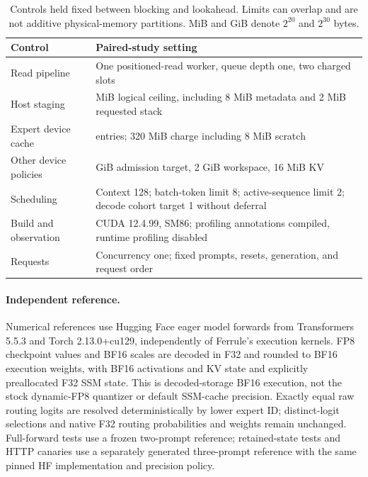 \begin{table}[!htbp]
\centering
\small
\begin{tabularx}{\linewidth}{@{}l>{\raggedright\arraybackslash}X@{}}
\toprule
Control & Paired-study setting \\
\midrule
Read pipeline & One positioned-read worker, queue depth one, two charged slots \\
Host staging & 64 MiB logical ceiling, including 8 MiB metadata and 2 MiB requested stack \\
Expert device cache & 64 entries; 320 MiB charge including 8 MiB scratch \\
Other device policies & 7 GiB admission target, 2 GiB workspace, 16 MiB KV \\
Scheduling & Context 128; batch-token limit 8; active-sequence limit 2; decode cohort target 1 without deferral \\
Build and observation & CUDA 12.4.99, SM86; profiling annotations compiled, runtime profiling disabled \\
Requests & Concurrency one; fixed prompts, resets, generation, and request order \\
\bottomrule
\end{tabularx}
\caption{Controls held fixed between blocking and lookahead. Limits can overlap
and are not additive physical-memory partitions. MiB and GiB denote $2^{20}$
and $2^{30}$ bytes.}
\label{tab:paired-config}
\end{table}

\paragraph{Independent reference.}
Numerical references use Hugging Face eager model forwards from Transformers
5.5.3 and Torch 2.13.0+cu129, independently of Ferrule's execution kernels.
FP8 checkpoint values and BF16 scales are decoded in F32 and rounded to BF16
execution weights, with BF16 activations and KV state and explicitly
preallocated F32 SSM state. This is decoded-storage BF16 execution, not the
stock dynamic-FP8 quantizer or default SSM-cache precision. Exactly equal
raw routing logits are resolved deterministically by lower expert ID;
distinct-logit selections and native F32 routing probabilities and weights
remain unchanged. Full-forward tests use a frozen two-prompt reference;
retained-state tests and HTTP canaries use a separately generated three-prompt
reference with the same pinned HF implementation and precision policy.


